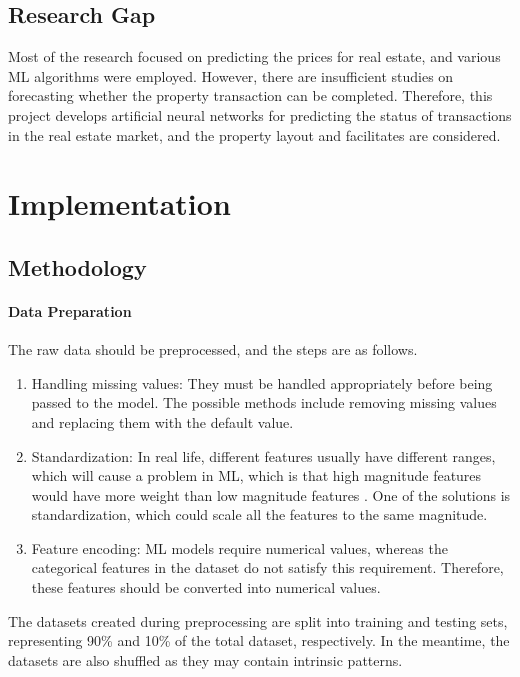 \documentclass[12pt,twoside]{report}
\begin{document}
\section{Research Gap}
Most of the research focused on predicting the prices for real estate, and various ML algorithms were employed. However, there are insufficient studies on forecasting whether the property transaction can be completed. Therefore, this project develops artificial neural networks for predicting the status of transactions in the real estate market, and the property layout and facilitates are considered. 

\chapter{Implementation}

\section{Methodology}
\subsubsection{Data Preparation}
The raw data should be preprocessed, and the steps are as follows. 
\begin{enumerate}
	\item Handling missing values: They must be handled appropriately before being passed to the model. The possible methods include removing missing values and replacing them with the default value.
	\item Standardization: In real life, different features usually have different ranges, which will cause a problem in ML, which is that high magnitude features would have more weight than low magnitude features \citep{RN4}. One of the solutions is standardization, which could scale all the features to the same magnitude.
	\item Feature encoding: ML models require numerical values, whereas the categorical features in the dataset do not satisfy this requirement. Therefore, these features should be converted into numerical values.
\end{enumerate}

The datasets created during preprocessing are split into training and testing sets, representing 90\% and 10\% of the total dataset, respectively. In the meantime, the datasets are also shuffled as they may contain intrinsic patterns.
\end{document}
